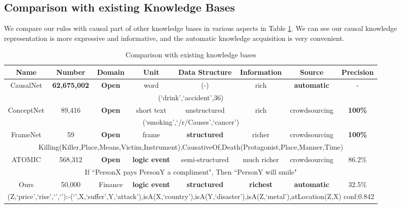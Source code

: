 \subsection{Comparison with existing Knowledge Bases}
We compare our rules with causal part of other knowledge bases in various aspects in Table \ref{tab:comparison_rule_with_kbs}. We can see our causal knowledge representation is more expressive and informative, and the automatic knowledge acquisition is very convenient.
\begin{table}[htbp]
\centering
	\begin{tabular}{|c|c|c|c|c|c|c|c|}\hline
	\textbf{Name}&\textbf{Number}&\textbf{Domain}&\textbf{Unit}&\textbf{Data Structure}&\textbf{Information}&\textbf{Source}&\textbf{Precision}\\ \hline
	CausalNet&\textbf{62,675,002}&\textbf{Open}&word&(-)&rich&\textbf{automatic}&-\\
	\multicolumn{8}{|c|}{(`drink',`accident',36)}\\\hline
	ConceptNet &89,416&\textbf{Open}&short text&unstructured&rich&crowdsourcing&\textbf{100\%}\\
	\multicolumn{8}{|c|}{(`smoking',`/r/Causes',`cancer')}\\\hline
	FrameNet&59&\textbf{Open}&frame&\textbf{structured}&richer&crowdsourcing&\textbf{100\%}\\
	\multicolumn{8}{|c|}{Killing(Killer,Place,Means,Victim,Instrument),CausativeOf,Death(Protagonist,Place,Manner,Time)}\\\hline
	ATOMIC&568,312&\textbf{Open}&\textbf{logic event}&semi-structured&much richer&crowdsourcing&86.2\%\\
	\multicolumn{8}{|c|}{If ``PersonX pays PersonY a compliment", Then ``PersonY will smile"}\\\hline
	Ours&50,000&Finance&\textbf{logic event}&\textbf{structured}&\textbf{richest}&\textbf{automatic}&32.5\%\\ 
\multicolumn{8}{|c|}{(Z,`price',`rise',`',`'):-(`',X,`suffer',Y,`attack'),isA(X,`country'),isA(Y,`disaster'),isA(Z,`metal'),atLocation(Z,X) conf:0.842}\\\hline	
	\end{tabular}
\caption{Comparison with existing knowledge bases}
\label{tab:comparison_rule_with_kbs}
\end{table}



